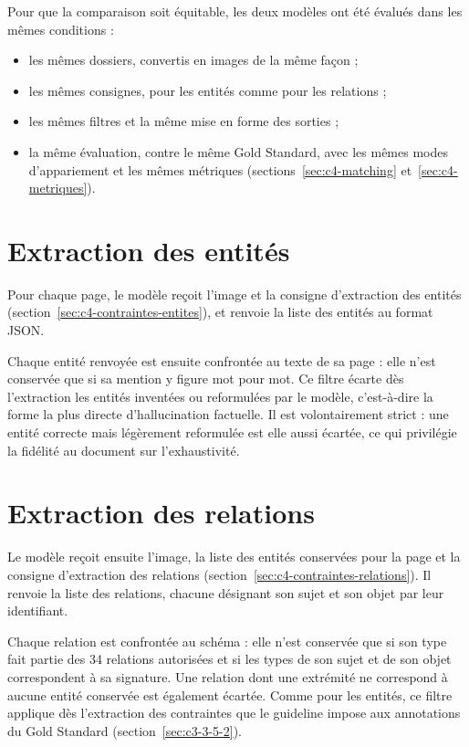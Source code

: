 Pour que la comparaison soit équitable, les deux modèles ont été évalués dans les mêmes conditions :
\begin{itemize}
  \item les mêmes  dossiers, convertis en images de la même façon ;
  \item les mêmes consignes, pour les entités comme pour les relations ;
  \item les mêmes filtres et la même mise en forme des sorties ;
  \item la même évaluation, contre le même Gold Standard, avec les mêmes modes d'appariement et les mêmes métriques (sections~\ref{sec:c4-matching} et~\ref{sec:c4-metriques}).
\end{itemize}

\section{Extraction des entités}\label{sec:c4-entites}

Pour chaque page, le modèle reçoit l'image et la consigne d'extraction des entités (section~\ref{sec:c4-contraintes-entites}), et renvoie la liste des entités au format JSON.

Chaque entité renvoyée est ensuite confrontée au texte de sa page : elle n'est conservée que si sa mention y figure mot pour mot. Ce filtre écarte dès l'extraction les entités inventées ou reformulées par le modèle, c'est-à-dire la forme la plus directe d'hallucination factuelle. Il est volontairement strict : une entité correcte mais légèrement reformulée est elle aussi écartée, ce qui privilégie la fidélité au document sur l'exhaustivité.

\section{Extraction des relations}\label{sec:c4-relations}

Le modèle reçoit ensuite l'image, la liste des entités conservées pour la page et la consigne d'extraction des relations (section~\ref{sec:c4-contraintes-relations}). Il renvoie la liste des relations, chacune désignant son sujet et son objet par leur identifiant.

Chaque relation est confrontée au schéma : elle n'est conservée que si son type fait partie des 34 relations autorisées et si les types de son sujet et de son objet correspondent à sa signature. Une relation dont une extrémité ne correspond à aucune entité conservée est également écartée. Comme pour les entités, ce filtre applique dès l'extraction des contraintes que le guideline impose aux annotations du Gold Standard (section~\ref{sec:c3-3-5-2}).

